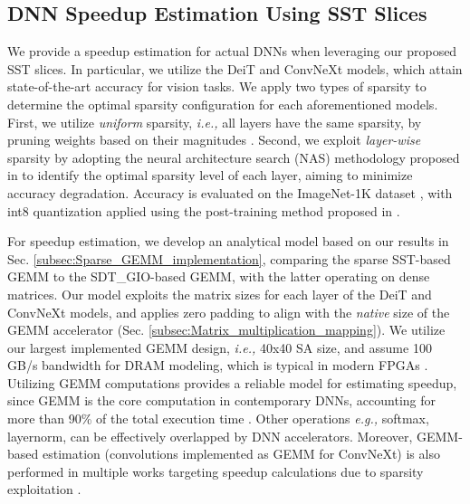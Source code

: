 
\subsection{DNN Speedup Estimation Using SST Slices}
\label{subsec:Performance_estimation_DNNs}

We provide a speedup estimation for actual DNNs when leveraging our proposed SST slices.
In particular, we utilize the DeiT \cite{DeiT_2021} and ConvNeXt \cite{Convnext_2022} models, which attain state-of-the-art accuracy for vision tasks.
We apply two types of sparsity to determine the optimal sparsity configuration for each aforementioned models. 
First, we utilize \textit{uniform} sparsity, \emph{i.e.,} all layers have the same sparsity, by pruning weights based on their magnitudes \cite{Nvidia_accelerate_sparse_2021}.
Second, we exploit \textit{layer-wise} sparsity by adopting the neural architecture search (NAS) methodology proposed in \cite{Huang_2024_CVPR} to identify the optimal sparsity level of each layer, aiming to minimize accuracy degradation. 
Accuracy is evaluated on the ImageNet-1K dataset \cite{deng2009imagenet}, with int8 quantization applied using the post-training method proposed in \cite{PTQ4ViT_arixv2022}.




For speedup estimation, we develop an analytical model based on our results in Sec. \ref{subsec:Sparse_GEMM_implementation}, comparing the sparse SST-based GEMM to the SDT\_GIO-based GEMM, with the latter operating on dense matrices.
Our model exploits the matrix sizes for each layer of the DeiT and ConvNeXt models, and applies zero padding to align with the \textit{native} size of the GEMM accelerator (Sec. \ref{subsec:Matrix_multiplication_mapping}).
We utilize our largest implemented GEMM design, \emph{i.e.,} 40x40 SA size, and assume 100 GB/s bandwidth for DRAM modeling, which is typical in modern FPGAs \cite{Speedster_product_brief, VCK_5000}.
Utilizing GEMM computations provides a reliable model for estimating speedup, since GEMM is the core computation in contemporary DNNs, accounting for more than 90\% of the total execution time \cite{adolf2016fathom, wang_gemm_breakdown}.
Other operations \emph{e.g.,} softmax, layernorm, can be effectively overlapped by DNN accelerators.
Moreover, GEMM-based estimation (convolutions implemented as GEMM for ConvNeXt) is also performed in multiple works targeting speedup calculations due to sparsity exploitation \cite{HighLight_MIT_2023, Vegeta_HPCA_2023, Sparse_tensor_GPUs_2019, STA_arxiv_2020, SDP_sparse_2023}.



